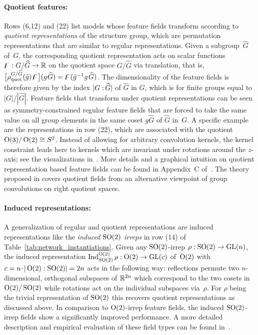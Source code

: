 \paragraph{Quotient features:}
Rows (6,12) and (22) list models whose feature fields transform according to \emph{quotient representations} of the structure group, which are permutation representations that are similar to regular representations.
Given a subgroup~$\widehat{G}$ of~$G$, the corresponding quotient representation acts on scalar functions $\digamma: G/\widehat{G} \to \mathbb{R}$ on the quotient space $G/\widehat{G}$ via translation, that is,
$\big[\rho_\textup{quot}^{G/\widehat{G}} (\tilde{g})\mkern2mu \digamma\big] (g\mkern1mu \widehat{G}) = \digamma(\tilde{g}^{-1}g \mkern2mu \widehat{G})$.
The dimensionality of the feature fields is therefore given by the index ${|G:\mkern-2mu\widehat{G}|}$ of $\widehat{G}$ in $G$, which is for finite groups equal to~$|G|/|\widehat{G}|$.
Feature fields that transform under quotient representations can be seen as symmetry-constrained regular feature fields that are forced to take the same value on all group elements in the same coset $g\widehat{G}$ of $\widehat{G}$ in~$G$.
A specific example are the representations in row (22), which are associated with the quotient $\operatorname{O}(3)/\operatorname{O}(2) \cong S^2$.
Instead of allowing for arbitrary convolution kernels, the kernel constraint leads here to kernels which are invariant under rotations around the $z$-axis; see the visualizations in~\cite{janssen2018design}.
More details and a graphical intuition on quotient representation based feature fields can be found in Appendix~C of~\cite{Weiler2019_E2CNN}.
The theory proposed in \cite{Kondor2018-GENERAL} covers quotient fields from an alternative viewpoint of group convolutions on right quotient spaces.


\paragraph{Induced representations:}
A generalization of regular and quotient representations are induced representations like the \emph{induced $\operatorname{SO}(2)$ irreps} in row (14)
of Table~\ref{tab:network_instantiations}.
Given any $\operatorname{SO}(2)$-irrep $\rho: \operatorname{SO}(2) \to \operatorname{GL}(n)$, the induced representation $\operatorname{Ind}_{\operatorname{SO}(2)}^{\operatorname{O}(2)}\rho: \operatorname{O}(2) \to \operatorname{GL}(c)$ of~$\operatorname{O}(2)$ with $c = n \mkern-2mu\cdot\! {|\operatorname{O}(2):\operatorname{SO}(2)|} = 2n$
acts in the following way:
reflections permute two $n$-dimensional, orthogonal subspaces of $\mathbb{R}^{2n}$ which correspond to the two cosets in $\operatorname{O}(2)/\operatorname{SO}(2)$ while rotations act on the individual subspaces via~$\rho$.
For $\rho$ being the trivial representation of $\operatorname{SO}(2)$ this recovers quotient representations as discussed above.
In comparison to $\operatorname{O}(2)$-irrep feature fields, the induced $\operatorname{SO}(2)$-irrep fields show a significantly improved performance.
A more detailed description and empirical evaluation of these field types can be found in~\cite{Weiler2019_E2CNN}.


